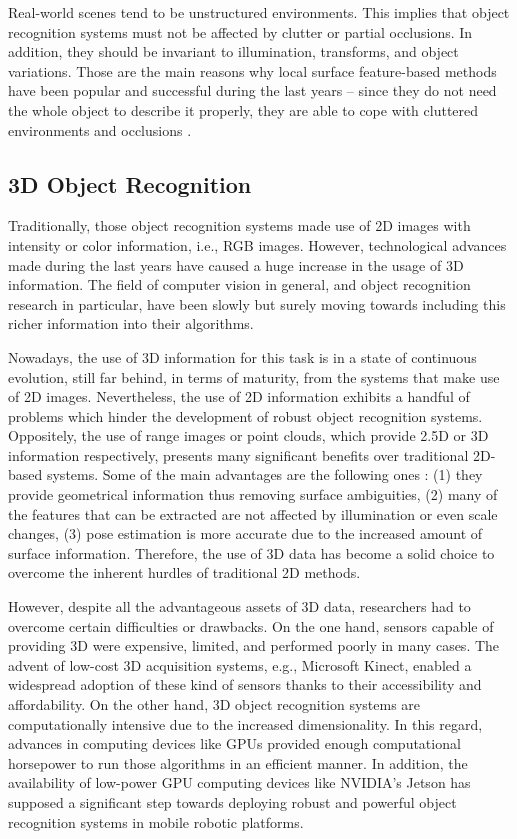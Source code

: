 Real-world scenes tend to be unstructured environments. This implies that object recognition systems must not be affected by clutter or partial occlusions. In addition, they should be invariant to illumination, transforms, and object variations. Those are the main reasons why local surface feature-based methods have been popular and successful during the last years -- since they do not need the whole object to describe it properly, they are able to cope with cluttered environments and occlusions \cite{Lowe1999}. 

\subsection{3D Object Recognition}
\label{cha:objrecog:sec:relatedworks:subsec:3d}

Traditionally, those object recognition systems made use of \acs{2D} images with intensity or color information, i.e., \ac{RGB} images. However, technological advances made during the last years have caused a huge increase in the usage of \acs{3D} information. The field of computer vision in general, and object recognition research in particular, have been slowly but surely moving towards including this richer information into their algorithms.

Nowadays, the use of \acs{3D} information for this task is in a state of continuous evolution, still far behind, in terms of maturity, from the systems that make use of \acs{2D} images. Nevertheless, the use of \acs{2D} information exhibits a handful of problems which hinder the development of robust object recognition systems. Oppositely, the use of range images or point clouds, which provide \acs{2.5D} or \acs{3D} information respectively, presents many significant benefits over traditional \acs{2D}-based systems. Some of the main advantages are the following ones \cite{Guo2014}: (1) they provide geometrical information thus removing surface ambiguities, (2) many of the features that can be extracted are not affected by illumination or even scale changes, (3) pose estimation is more accurate due to the increased amount of surface information. Therefore, the use of \acs{3D} data has become a solid choice to overcome the inherent hurdles of traditional \acs{2D} methods.

However, despite all the advantageous assets of \acs{3D} data, researchers had to overcome certain difficulties or drawbacks. On the one hand, sensors capable of providing \acs{3D} were expensive, limited, and performed poorly in many cases. The advent of low-cost \acs{3D} acquisition systems, e.g., Microsoft Kinect, enabled a widespread adoption of these kind of sensors thanks to their accessibility and affordability. On the other hand, \acs{3D} object recognition systems are computationally intensive due to the increased dimensionality. In this regard, advances in computing devices like \acp{GPU} provided enough computational horsepower to run those algorithms in an efficient manner. In addition, the availability of low-power \acs{GPU} computing devices like NVIDIA's Jetson has supposed a significant step towards deploying robust and powerful object recognition systems in mobile robotic platforms.

